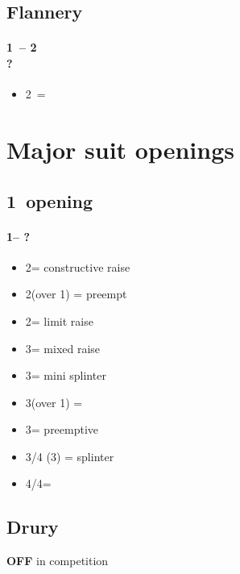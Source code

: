 \documentclass[12pt, a4paper]{report}
\begin{document}
{{        \section*{\colorbox{blue!30}{Flannery}}
         {
            \subsubsection*{1\minor\ -- 2\hearts \\ ?}
            \begin{itemize}
                \item 2\nt\ = \lsf \vimp
            \end{itemize}
        }
    }

    \chapter*{\colorbox{Plum!30}{Major suit openings}}
     {

        \section*{\colorbox{blue!30}{1\major\ opening}}
         {
            \subsubsection*{1\major -- ?}
            \begin{itemize}
                \item 2\major = constructive raise
                \item 2\spades (over 1\hearts) = preempt
                \item 2\nt = limit raise
                \item 3\clubs = mixed raise
                \item 3\diams = mini splinter
                \item 3\hearts (over 1\spades) = \nat\ \inv
                \item 3\major = preemptive
                \item 3\nt/4 (3\spades) = splinter
                \item 4\diams/4\hearts = \major
            \end{itemize}
        }

        \section*{\colorbox{blue!30}{Drury}}
         {
            {\textbf{OFF}} in competition

}}}
\end{document}
